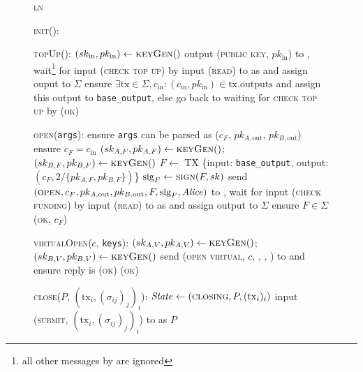 \begin{figure}[H]
  \begin{systembox}{\textsc{ln}}
    \begin{algorithmic}[1]
      \State \textsc{init}():
      \Indent
        \State \TODO{}
      \EndIndent
      \Statex

      \State \textsc{topUp}(\alice):
      \Indent
        \State $(sk_{\mathrm{in}}, pk_{\mathrm{in}}) \gets \textsc{keyGen}()$
        \State output (\textsc{public key}, $pk_{\mathrm{in}}$) to \alice,
        wait\footnote{all other messages by \alice are ignored} for input
        (\textsc{check top up}) by \alice
        \State input (\textsc{read}) to \ledger as \alice and assign ouput to
        $\Sigma$
        \State ensure $\exists \mathrm{tx} \in \Sigma, c_{\mathrm{in}}:
        (c_{\mathrm{in}}, pk_{\mathrm{in}}) \in \mathrm{tx.outputs}$ and assign
        this output to \texttt{base\_output}, else go back to waiting for
        \textsc{check top up} by \alice
        \State \Return (\textsc{ok})
      \EndIndent
      \Statex

      \State \textsc{open}(\texttt{args}):
      \Indent
        \State ensure \texttt{args} can be parsed as ($c_F$, $pk_{A,
        \mathrm{out}}$, $pk_{B, \mathrm{out}}$)
        \State ensure $c_F = c_{\mathrm{in}}$
        \State $(sk_{A, F}, pk_{A, F}) \gets \textsc{keyGen}()$; $(sk_{B, F},
        pk_{B, F}) \gets \textsc{keyGen}()$
        \State $F \gets$ TX \{input: \texttt{base\_output}, output: $(c_F,
        2/\{pk_{A, F}, pk_{B, F}\})$\}
        \State $\mathrm{sig}_F \gets \textsc{sign}(F, sk)$
        \State send $(\textsc{open}, c_F, pk_{A, \mathrm{out}}, pk_{B,
        \mathrm{out}}, F, \mathrm{sig}_F, \mathit{Alice})$ to \adversary, wait for
        input (\textsc{check funding}) by \alice
        \State input (\textsc{read}) to \ledger as \alice and assign output to
        $\Sigma$
        \State ensure $F \in \Sigma$
        \State \Return (\textsc{ok}, $c_F$)
      \EndIndent
      \Statex

      \State \textsc{virtualOpen}($c$, \texttt{keys}):
      \Indent
        \State $(sk_{A, V}, pk_{A, V}) \gets \textsc{keyGen}()$; $(sk_{B, V},
        pk_{B, V}) \gets \textsc{keyGen}()$
        \State {}
        \State send (\textsc{open virtual}, $c$, \bob, \charlie, \alice) to
        \adversary and ensure reply is \textsc{(ok)}
        \State \Return (\textsc{ok})
      \EndIndent
      \Statex

      \State \textsc{close}($P$, $(\mathrm{tx}_i, (\sigma_{ij})_j)_i$):
      \Indent
          \State $\mathit{State} \gets (\textsc{closing}, P, (\mathrm{tx}_i)_i)$
          \State input (\textsc{submit}, $(\mathrm{tx}_i, (\sigma_{ij})_j)_i$)
          to \ledger as $P$
      \EndIndent
      \Statex


\end{algorithmic}
\end{systembox}
\end{figure}
